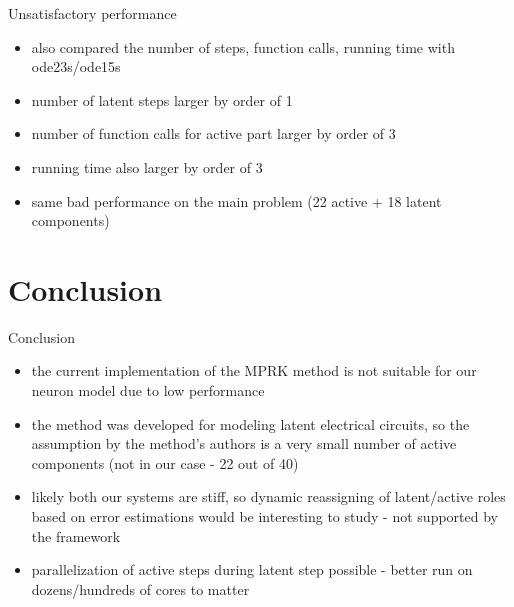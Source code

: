 \documentclass[11pt]{beamer}
\begin{document}
\begin{frame}{Unsatisfactory performance}
\begin{itemize}
\item also compared the number of steps, function calls, running time with ode23s/ode15s
\item number of latent steps larger by order of 1
\item number of function calls for active part larger by order of 3
\item running time also larger by order of 3
\item same bad performance on the main problem (22 active + 18 latent components)
\end{itemize}
\end{frame}

\section{Conclusion}
\begin{frame}{Conclusion}
\begin{itemize}
\item the current implementation of the MPRK method is not suitable for our neuron model due to low performance
\item the method was developed for modeling latent electrical circuits, so the assumption by the method's authors is a very small number of active components (not in our case - 22 out of 40)
\item likely both our systems are stiff, so dynamic reassigning of latent/active roles based on error estimations would be interesting to study - not supported by the framework
\item parallelization of active steps during latent step possible - better run on dozens/hundreds of cores to matter
\end{itemize}

\end{frame}

\fi
\end{document}

